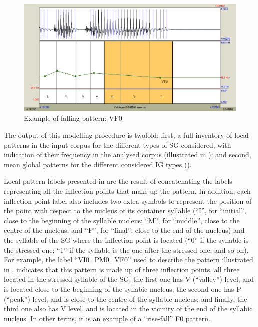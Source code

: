 \documentclass[output=paper]{langsci/langscibook}
\begin{document}
\begin{figure}
\includegraphics[width=\textwidth]{figures/GAR-img010.png}
\caption{Example of falling pattern: VF0 \citep{Garrido2012enton}}
\label{fig:gar:10}
\end{figure}

The output of this modelling procedure is twofold: first, a full inventory of local patterns in the input corpus for the different types of SG considered, with indication of their frequency in the analysed corpus (illustrated in ); and second, mean global patterns for the different considered IG types ().

Local pattern labels presented in  are the result of concatenating the labels representing all the inflection points that make up the pattern. In addition, each inflection point label also includes two extra symbols to represent the position of the point with respect to the nucleus of its container syllable (``I'', for ``initial'', close to the beginning of the syllable nucleus; ``M'', for ``middle'', close to the centre of the nucleus; and ``F'', for ``final'', close to the end of the nucleus) and the syllable of the SG where the inflection point is located (``0'' if the syllable is the stressed one; ``1'' if the syllable is the one after the stressed one; and so on). For example, the label ``VI0\_PM0\_VF0'' used to describe the pattern illustrated in , indicates that this pattern is made up of three inflection points, all three located in the stressed syllable of the SG: the first one has V (``valley'') level, and is located close to the beginning of the syllabic nucleus; the second one has P (``peak'') level, and is close to the centre of the syllable nucleus; and finally, the third one also has V level, and is located in the vicinity of the end of the syllabic nucleus. In other terms, it is an example of a ``rise-fall'' F0 pattern.
\end{document}
